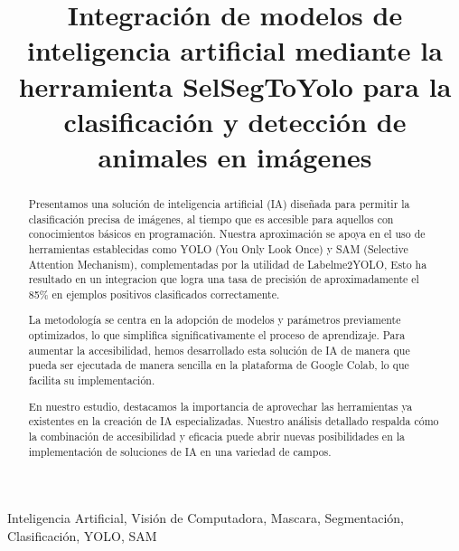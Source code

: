 \documentclass[journal]{IEEEtran}
\begin{document}
\title{Integración de modelos de inteligencia artificial mediante la herramienta SelSegToYolo para la clasificación y detección de animales en imágenes}

\author{
}

\maketitle

\begin{abstract}
Presentamos una solución de inteligencia artificial (IA) diseñada para permitir la clasificación precisa de imágenes, al tiempo que es accesible para aquellos con conocimientos básicos en programación. Nuestra aproximación se apoya en el uso de herramientas establecidas como YOLO (You Only Look Once) y SAM (Selective Attention Mechanism), complementadas por la utilidad de Labelme2YOLO, Esto ha resultado en un integracion que logra una tasa de precisión de aproximadamente el 85\% en ejemplos positivos clasificados correctamente.

La metodología se centra en la adopción de modelos y parámetros previamente optimizados, lo que simplifica significativamente el proceso de aprendizaje. Para aumentar la accesibilidad, hemos desarrollado esta solución de IA de manera que pueda ser ejecutada de manera sencilla en la plataforma de Google Colab, lo que facilita su implementación.

En nuestro estudio, destacamos la importancia de aprovechar las herramientas ya existentes en la creación de IA especializadas. Nuestro análisis detallado respalda cómo la combinación de accesibilidad y eficacia puede abrir nuevas posibilidades en la implementación de soluciones de IA en una variedad de campos.
\end{abstract}

\begin{IEEEkeywords}
Inteligencia Artificial, Visión de Computadora, Mascara, Segmentación, Clasificación, YOLO, SAM
\end{IEEEkeywords}
\end{document}
